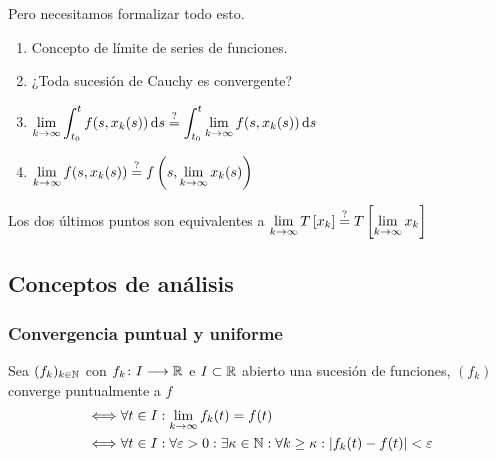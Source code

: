 Pero necesitamos formalizar todo esto.
\begin{enumerate}
	\item Concepto de límite de series de funciones.
	\item ¿Toda sucesión de Cauchy es convergente?
	\item $\ds \lim_{k\to\infty} \int_{t_0}^t f(s, x_k(s)) \odif{s} \stackrel{?}{=} \int_{t_0}^t \lim_{k\to\infty} f(s, x_k(s)) \odif{s}$
	\item $\displaystyle \lim_{k\to\infty} f(s, x_k(s)) \stackrel{?}{=} f\left(s, \lim_{k\to\infty} x_k(s)\right)$
\end{enumerate}
Los dos últimos puntos son equivalentes a $\displaystyle \lim_{k\to\infty} T\left[x_k\right] \stackrel{?}{=} T\left[\lim_{k\to\infty} x_k\right]$
\subsection{Conceptos de análisis}
\subsubsection{Convergencia puntual y uniforme}
\begin{defn}
	Sea $(f_k)_{k\in\mathbb{N}}$ con $f_k \colon I \longrightarrow \mathbb{R}$ e $I\subset \mathbb{R}$ abierto una sucesión de funciones, $(f_k)$ converge puntualmente a $f$
	\[\begin{aligned}
			\iff & \forall t\in I : \lim_{k\to\infty} f_k(t) = f(t)                                                                              \\
			\iff & \forall t \in I : \forall \varepsilon > 0 :  \exists \kappa \in \mathbb{N} : \forall k\geq \kappa : \left|f_k(t) - f(t)\right| < \varepsilon
		\end{aligned}\]
\end{defn}

